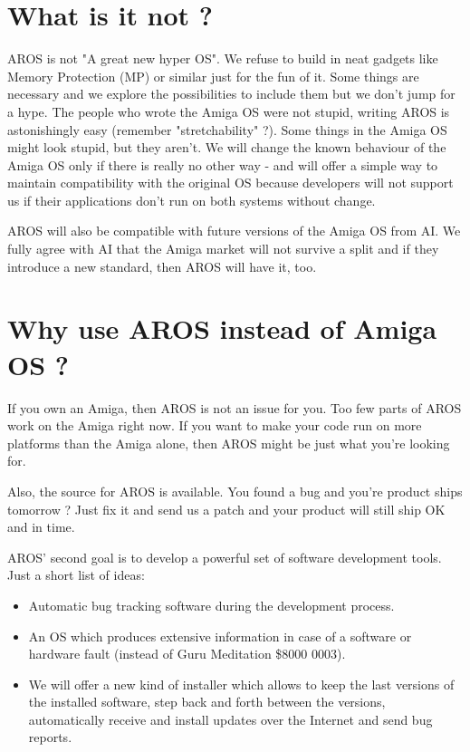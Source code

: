 \section{What is it not ?}

AROS is not "A great new hyper OS". We refuse to build in neat gadgets like
Memory Protection (MP) or similar just for the fun of it. Some things are
necessary and we explore the possibilities to include them but we don't
jump for a hype. The people who wrote the Amiga OS were not stupid, writing
AROS is astonishingly easy (remember "stretchability" ?). Some things in the
Amiga OS might look stupid, but they aren't. We will change the known
behaviour of the Amiga OS only if there is really no other way - and will
offer a simple way to maintain compatibility with the original OS because
developers will not support us if their applications don't run on both
systems without change.

AROS will also be compatible with future versions of the Amiga OS from AI.
We fully agree with AI that the Amiga market will not survive a split and
if they introduce a new standard, then AROS will have it, too.

\section{Why use AROS instead of Amiga OS ?}

If you own an Amiga, then AROS is not an issue for you. Too few parts of
AROS work on the Amiga right now. If you want to make your code run on more
platforms than the Amiga alone, then AROS might be just what you're looking
for.

Also, the source for AROS is available. You found a bug and you're product
ships tomorrow ? Just fix it and send us a patch and your product will
still ship OK and in time.

AROS' second goal is to develop a powerful set of software development
tools. Just a short list of ideas:

\begin{itemize}
\item Automatic bug tracking software during the development process.

\item An OS which produces extensive information in case of a software or
hardware fault (instead of Guru Meditation \$8000 0003).

\item We will offer a new kind of installer which allows to keep the last
versions of the installed software, step back and forth between the
versions, automatically receive and install updates over the Internet and
send bug reports.

\end{itemize}

